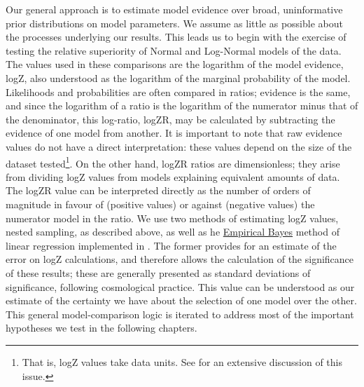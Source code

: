 Our general approach is to estimate model evidence over broad, uninformative prior distributions on model parameters. We assume as little as possible about the processes underlying our results. This leads us to begin with the exercise of testing the relative superiority of Normal and Log-Normal models of the data. The values used in these comparisons are the logarithm of the model evidence, logZ, also understood as the logarithm of the marginal probability of the model. Likelihoods and probabilities are often compared in ratios; evidence is the same, and since the logarithm of a ratio is the logarithm of the numerator minus that of the denominator, this log-ratio, logZR, may be calculated by subtracting the evidence of one model from another. It is important to note that raw evidence values do not have a direct interpretation: these values depend on the size of the dataset tested\footnote{That is, logZ values take data units. See \cite{Skilling2012} for an extensive discussion of this issue.}. On the other hand, logZR ratios are dimensionless; they arise from dividing logZ values from models explaining equivalent amounts of data. The logZR value can be interpreted directly as the number of orders of magnitude in favour of (positive values) or against (negative values) the numerator model in the ratio. We use two methods of estimating logZ values, nested sampling, as described above, as well as he \hyperref[ssec:EmpiricalBayes]{Empirical Bayes} method of linear regression implemented in . The former provides for an estimate of the error on logZ calculations, and therefore allows the calculation of the significance of these results; these are generally presented as standard deviations of significance, following cosmological practice. This value can be understood as our estimate of the certainty we have about the selection of one model over the other. This general model-comparison logic is iterated to address most of the important hypotheses we test in the following chapters.